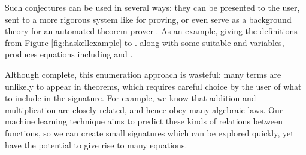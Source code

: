 Such conjectures can be used in several ways: they can be presented to the user, sent to a more rigorous system like \hspec{} for proving, or even serve as a background theory for an automated theorem prover \cite{claessen2013automating}. As an example, giving the definitions from Figure \ref{fig:haskellexample} to \qspec{}. along with some suitable  and  variables, produces equations including  and .

\iffalse
As an example, we can consider a simple signature containing the expressions from Figure \ref{fig:haskellexample}:

\begin{align*}
  \Sigma_{\texttt{Nat}} = \{\texttt{Z}, \texttt{S}, \texttt{odd}, \texttt{even}\}
\end{align*}

Together with a set of variables, say $V_{\texttt{Nat}} = \{a, b, c\}$, \qspec{}'s enumeration will resemble the following:

\begin{align*}
  terms_{\texttt{Nat}} = [& \texttt{Z},\ \texttt{S},\ \texttt{odd},\ \texttt{even},\ a,\ b,\ c,\ \texttt{S Z},\ \texttt{S}\ a,\ \texttt{S}\ b, \\
                     & \texttt{S}\ c,\ \texttt{odd Z},\ \texttt{odd}\ a,\ \dots ]
\end{align*}

Notice that functions such as \hs{odd} and \hs{even} are valid terms, despite not being applied to any arguments. In addition, Haskell curries multi-argument functions, allowing them to be applied to one argument at a time, as used in the construction of $terms$.

These terms will be grouped into four classes, one each for \hs{Nat}, \hs{Nat -> Nat}, \hs{Nat -> Bool} and \hs{Bool}. As the variables $a$, $b$ and $c$ are instantiated to various randomly-generated numbers, these equivalence classes will be divided, until eventually the equations such as $odd (S a) = even a$ and $even (S a) = odd a$ are conjectured.
\fi

Although complete, this enumeration approach is wasteful: many terms are unlikely to appear in theorems, which requires careful choice by the user of what to include in the signature. For example, we know that addition and multiplication are closely related, and hence obey many algebraic laws. Our machine learning technique aims to predict these kinds of relations between functions, so we can create small signatures which can be explored quickly, yet have the potential to give rise to many equations.

